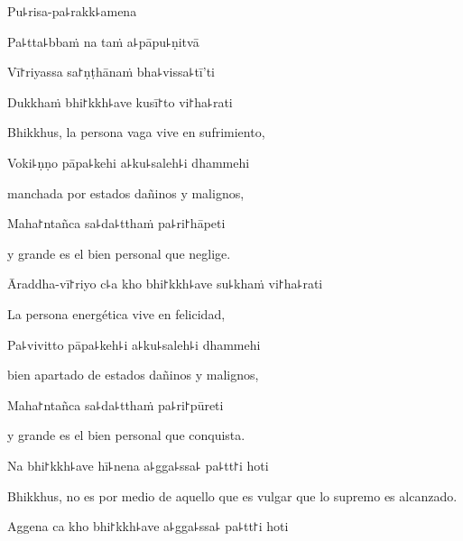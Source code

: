 
Pu꜕risa-pa꜕rakk꜕amena


Pa꜕tta꜕bbaṁ na taṁ a꜕pāpu꜕ṇitvā


Vī꜓riyassa sa꜓ṇṭhānaṁ bha꜕vissa꜕tī'ti


Dukkhaṁ bhi꜓kkh꜕ave kusī꜓to vi꜓ha꜕rati

\begin{english}
	Bhikkhus, la persona vaga vive en sufrimiento,
\end{english}

Voki꜕ṇṇo pāpa꜕kehi a꜕ku꜕saleh꜕i dhammehi

\begin{english}
	manchada por estados dañinos y malignos,
\end{english}

Maha꜓ntañca sa꜕da꜕tthaṁ pa꜕ri꜓hāpeti

\begin{english}
	y grande es el bien personal que neglige.
\end{english}

\ifaivedition
\clearpage
\fi

Āraddha-vī꜓riyo c꜕a kho bhi꜓kkh꜕ave su꜕khaṁ vi꜓ha꜕rati

\begin{english}
	La persona energética vive en felicidad,
\end{english}

Pa꜕vivitto pāpa꜕keh꜕i a꜕ku꜕saleh꜕i dhammehi

\begin{english}
	bien apartado de estados dañinos y malignos,
\end{english}

Maha꜓ntañca sa꜕da꜕tthaṁ pa꜕ri꜓pūreti

\begin{english}
	y grande es el bien personal que conquista.
\end{english}

Na bhi꜓kkh꜕ave hī꜕nena a꜕gga꜕ssa꜕ pa꜕tt꜓i hoti

\begin{english}
	Bhikkhus, no es por medio de aquello que es vulgar que lo supremo es alcanzado.
\end{english}

Aggena ca kho bhi꜓kkh꜕ave a꜕gga꜕ssa꜕ pa꜕tt꜓i hoti

